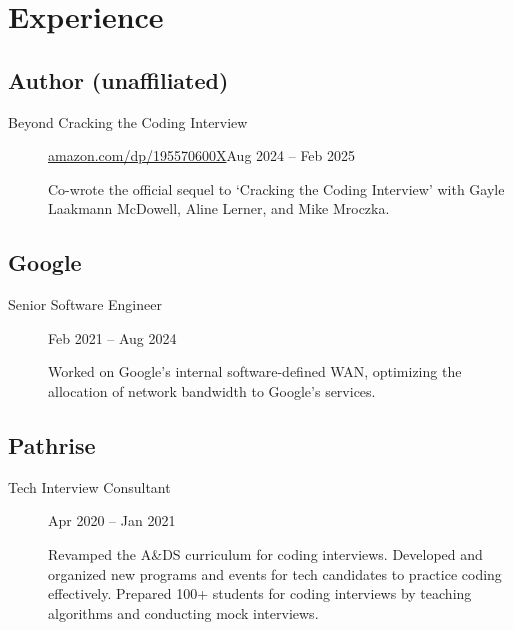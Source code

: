 \documentclass[letterpaper,10pt,oneside]{article}
\begin{document}
\section*{Experience}
\subsection*{Author (unaffiliated)}
\vspace{-3px}
\begin{description}
	\item[Beyond Cracking the Coding Interview]\quad \href{https://www.amazon.com/dp/195570600X}{amazon.com/dp/195570600X}\hfill Aug 2024 -- Feb 2025
	
	Co-wrote the official sequel to `Cracking the Coding Interview' with Gayle Laakmann McDowell, Aline Lerner, and Mike Mroczka.

\end{description}
\subsection*{Google}
\vspace{-3px}
\begin{description}
	\item[Senior Software Engineer]\hfill Feb 2021 -- Aug 2024
	
	Worked on Google's internal software-defined WAN, optimizing the allocation of network bandwidth to Google's services.	
	
\end{description}

\subsection*{Pathrise}
\vspace{-3px}
\begin{description}
	\item[Tech Interview Consultant]\hfill Apr 2020 -- Jan 2021
	
	Revamped the A\&DS curriculum for coding interviews. Developed and organized new programs and events for tech candidates to practice coding effectively. Prepared 100+ students for coding interviews by teaching algorithms and conducting mock interviews.
\end{description}
\end{document}
